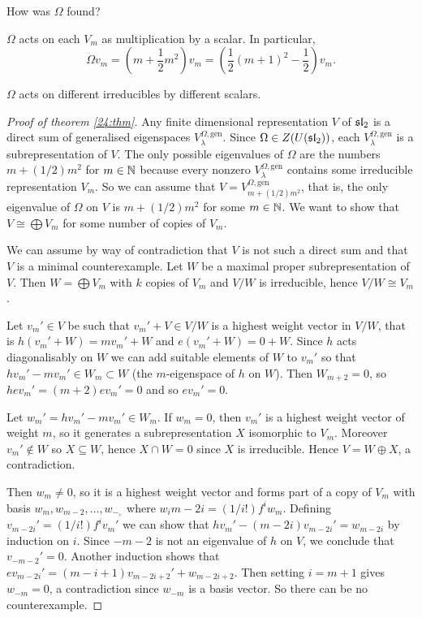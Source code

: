 How was $\Omega$ found?

\begin{cor}
  $\Omega$ acts on each $V_m$ as multiplication by a scalar.
  In particular,
  \[ \Omega v_m = \left( m + \frac 12 m^2 \right) v_m = \left( \frac 12 (m+1)^2 - \frac 12 \right) v_m. \]
\end{cor}

\begin{rmk}
  $\Omega$ acts on different irreducibles by different scalars.
\end{rmk}

\begin{proof}[Proof of theorem \ref{24:thm}]
  Any finite dimensional representation $V$ of $\operatorname{\mathfrak{sl}}_2$ is a direct sum of generalised eigenspaces $V_\lambda^{\Omega,\text{gen}}$.
  Since $\Omega \in Z(U(\operatorname{\mathfrak{sl}}_2))$, each $V_\lambda^{\Omega,\text{gen}}$ is a subrepresentation of $V$.
  The only possible eigenvalues of $\Omega$ are the numbers $m+(1/2)m^2$ for $m
  \in \mathbb{N}$ because every nonzero $V_\lambda^{\Omega,\text{gen}}$ contains some irreducible representation $V_m$.
  So we can assume that $V=V_{m+(1/2)m^2}^{\Omega,\text{gen}}$, that is, the only eigenvalue of $\Omega$ on $V$ is $m+(1/2)m^2$ for some $m \in \mathbb{N}$.
  We want to show that $V \cong \bigoplus V_m$ for some number of copies of $V_m$.

  We can assume by way of contradiction that $V$ is not such a direct sum and that $V$ is a minimal counterexample.
  Let $W$ be a maximal proper subrepresentation of $V$.
  Then $W = \bigoplus V_m$ with $k$ copies of $V_m$ and $V/W$ is irreducible, hence $V/W \cong V_m$.
  
  Let $v_m' \in V$ be such that $v_m'+V \in V/W$ is a highest weight vector in $V/W$, that is $h(v_m'+W)=mv_m'+W$ and $e(v_m'+W)=0+W$.
  Since $h$ acts diagonalisably on $W$ we can add suitable elements of $W$ to $v_m'$ so that $hv_m'-mv_m' \in W_m \subset W$ (the $m$-eigenspace of $h$ on $W$).
  Then $W_{m+2}=0$, so $hev_m'=(m+2)ev_m'=0$ and so $ev_m'=0$.

  Let $w_m' = hv_m'-mv_m' \in W_m$.
  If $w_m=0$, then $v_m'$ is a highest weight vector of weight $m$, so it generates a subrepresentation $X$ isomorphic to $V_m$.
  Moreover $v_m' \notin W$ so $X \subseteq W$, hence $X \cap W = 0$ since $X$ is irreducible.
  Hence $V = W \oplus X$, a contradiction.

  Then $w_m \neq 0$, so it is a highest weight vector and forms part of a copy of $V_m$ with basis $w_m,w_{m-2},\ldots,w_{-,}$ where $w_i{m-2i}=(1/i!)f^iw_m$.
  Defining $v_{m-2i}'=(1/i!)f^iv_m'$ we can show that $hv_m'-(m-2i)v_{m-2i}'=w_{m-2i}$ by induction on $i$.
  Since $-m-2$ is not an eigenvalue of $h$ on $V$, we conclude that $v_{-m-2}'=0$.
  Another induction shows that $ev_{m-2i}'=(m-i+1)v_{m-2i+2}'+w_{m-2i+2}$.
  Then setting $i=m+1$ gives $w_{-m}=0$, a contradiction since $w_{-m}$ is a basis vector.
  So there can be no counterexample.
\end{proof}
